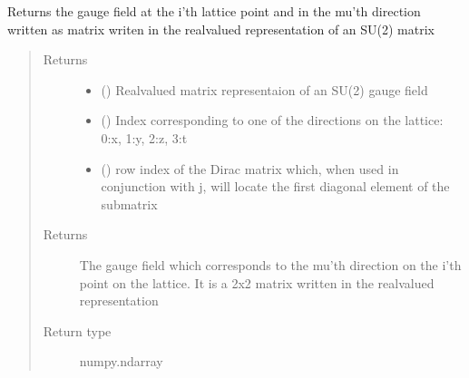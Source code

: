 \documentclass[letterpaper,10pt,english]{sphinxmanual}
\begin{document}
\begin{fulllineitems}
\label{\detokenize{index:su2.showU}}
Returns the gauge field at the i’th lattice point and in the
mu’th direction written as matrix writen in the real\sphinxhyphen{}valued
representation of an SU(2) matrix
\begin{quote}\begin{description}
\item[{Returns}] \leavevmode
\begin{itemize}
\item {} 
 () \textendash{} Real\sphinxhyphen{}valued matrix representaion of an SU(2) gauge field

\item {} 
 () \textendash{} Index corresponding to one of the directions on the lattice:
0:x, 1:y, 2:z, 3:t

\item {} 
 () \textendash{} row index of the Dirac matrix which, when used in conjunction
with j, will locate the first diagonal element of the submatrix

\end{itemize}


\item[{Returns}] \leavevmode
The gauge field which corresponds to the mu’th direction on the
i’th point on the lattice. It is a 2x2 matrix written in the
real\sphinxhyphen{}valued representation

\item[{Return type}] \leavevmode
numpy.ndarray

\end{description}\end{quote}

\end{fulllineitems}

\end{document}
